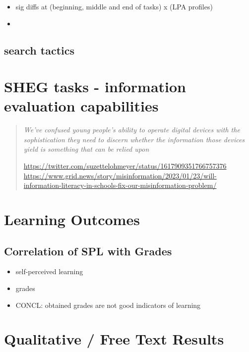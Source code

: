 \documentclass[letterpaper, nobind]{templates/ociamthesis}
\providecommand{\tightlist}{%
  \setlength{\itemsep}{0pt}\setlength{\parskip}{0pt}}
\begin{document}
\begin{itemize}
\tightlist
\item
  sig diffs at (beginning, middle and end of tasks) x (LPA profiles)
\item
\end{itemize}

\hypertarget{search-tactics}{%
\subsection{search tactics}\label{search-tactics}}

\hypertarget{sheg-tasks---information-evaluation-capabilities}{%
\section{SHEG tasks - information evaluation capabilities}\label{sheg-tasks---information-evaluation-capabilities}}

\begin{quote}
\emph{We've confused young people's ability to operate digital devices with the sophistication they need to discern whether the information those devices yield is something that can be relied upon}

\url{https://twitter.com/suzettelohmeyer/status/1617909351766757376}
\url{https://www.grid.news/story/misinformation/2023/01/23/will-information-literacy-in-schools-fix-our-misinformation-problem/}
\end{quote}

\hypertarget{learning-outcomes}{%
\section{Learning Outcomes}\label{learning-outcomes}}

\hypertarget{correlation-of-spl-with-grades}{%
\subsection{Correlation of SPL with Grades}\label{correlation-of-spl-with-grades}}

\begin{itemize}
\tightlist
\item
  self-perceived learning
\item
  grades
\item
  CONCL: obtained grades are not good indicators of learning
\end{itemize}

\hypertarget{qualitative-free-text-results}{%
\section{Qualitative / Free Text Results}\label{qualitative-free-text-results}}
\end{document}
